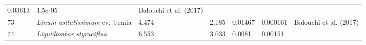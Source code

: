 \documentclass[]{article}
\begin{document}
\begin{longtable}[]{@{}lllllll@{}}
\begin{minipage}[t]{0.08\columnwidth}
0.03613\strut
\end{minipage} & \begin{minipage}[t]{0.08\columnwidth}\raggedright
1.5e-05\strut
\end{minipage} & \begin{minipage}[t]{0.23\columnwidth}\raggedright
Balouchi et al. (2017)\strut
\end{minipage}\tabularnewline
\begin{minipage}[t]{0.05\columnwidth}\raggedright
73\strut
\end{minipage} & \begin{minipage}[t]{0.23\columnwidth}\raggedright
\emph{Linum usitatissimum }cv. Urmia\strut
\end{minipage} & \begin{minipage}[t]{0.05\columnwidth}\raggedright
4.474\strut
\end{minipage} & \begin{minipage}[t]{0.08\columnwidth}\raggedright
2.185\strut
\end{minipage} & \begin{minipage}[t]{0.08\columnwidth}\raggedright
0.01467\strut
\end{minipage} & \begin{minipage}[t]{0.08\columnwidth}\raggedright
0.000161\strut
\end{minipage} & \begin{minipage}[t]{0.23\columnwidth}\raggedright
Balouchi et al. (2017)\strut
\end{minipage}\tabularnewline
\begin{minipage}[t]{0.05\columnwidth}\raggedright
74\strut
\end{minipage} & \begin{minipage}[t]{0.23\columnwidth}\raggedright
\emph{Liquidambar styraciflua}\strut
\end{minipage} & \begin{minipage}[t]{0.05\columnwidth}\raggedright
6.553\strut
\end{minipage} & \begin{minipage}[t]{0.08\columnwidth}\raggedright
3.033\strut
\end{minipage} & \begin{minipage}[t]{0.08\columnwidth}\raggedright
0.0081\strut
\end{minipage} & \begin{minipage}[t]{0.08\columnwidth}\raggedright
0.00151\strut
\end{minipage} & \begin{minipage}[t]{0.23\columnwidth}\raggedright

\end{minipage}
\end{longtable}
\end{document}
